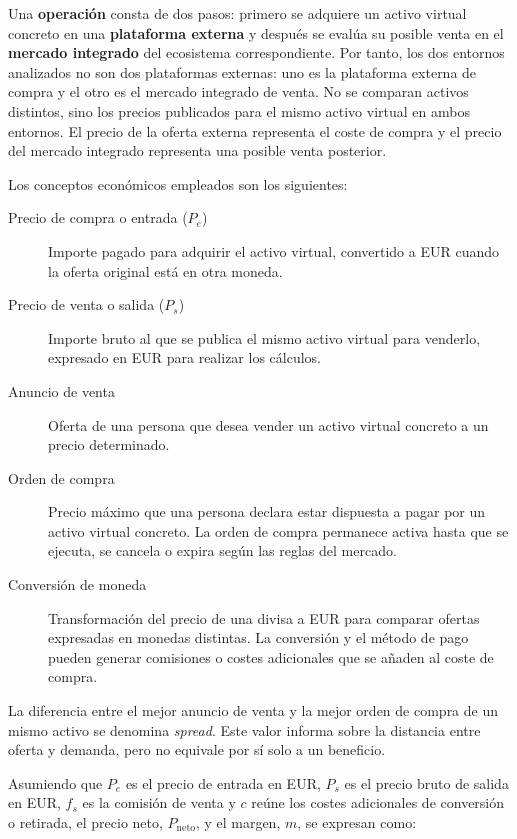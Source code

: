 Una \textbf{operación} consta de dos pasos: primero se adquiere un activo virtual concreto en una \textbf{plataforma externa} y después se evalúa su posible venta en el \textbf{mercado integrado} del ecosistema correspondiente. Por tanto, los dos entornos analizados no son dos plataformas externas: uno es la plataforma externa de compra y el otro es el mercado integrado de venta. No se comparan activos distintos, sino los precios publicados para el mismo activo virtual en ambos entornos. El precio de la oferta externa representa el coste de compra y el precio del mercado integrado representa una posible venta posterior.

Los conceptos económicos empleados son los siguientes:
\begin{description}
    \item[Precio de compra o entrada ($P_e$)] Importe pagado para adquirir el activo virtual, convertido a EUR cuando la oferta original está en otra moneda.
    \item[Precio de venta o salida ($P_s$)] Importe bruto al que se publica el mismo activo virtual para venderlo, expresado en EUR para realizar los cálculos.

    \item[Anuncio de venta] Oferta de una persona que desea vender un activo virtual concreto a un precio determinado.
    \item[Orden de compra] Precio máximo que una persona declara estar dispuesta a pagar por un activo virtual concreto. La orden de compra permanece activa hasta que se ejecuta, se cancela o expira según las reglas del mercado.
    \item[Conversión de moneda] Transformación del precio de una divisa a EUR para comparar ofertas expresadas en monedas distintas. La conversión y el método de pago pueden generar comisiones o costes adicionales que se añaden al coste de compra.
\end{description}

La diferencia entre el mejor anuncio de venta y la mejor orden de compra de un mismo activo se denomina \textit{spread}. Este valor informa sobre la distancia entre oferta y demanda, pero no equivale por sí solo a un beneficio.

Asumiendo que $P_e$ es el precio de entrada en EUR, $P_s$ es el precio bruto de salida en EUR, $f_s$ es la comisión de venta y $c$ reúne los costes adicionales de conversión o retirada, el precio neto, $P_{\mathrm{neto}}$, y el margen, $m$, se expresan como:

